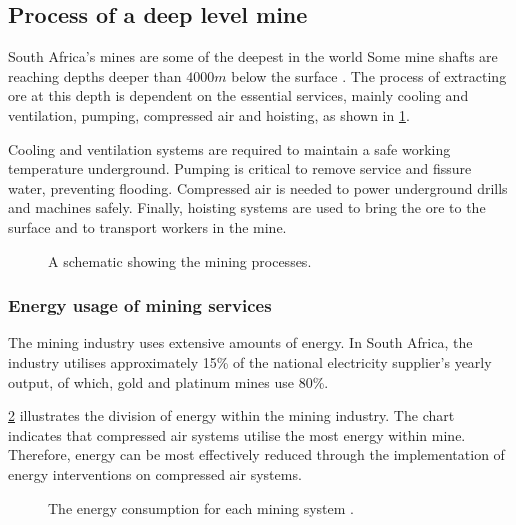 	\subsection{Process of a deep level mine}
	South Africa's mines are some of the deepest in the world Some mine shafts are reaching depths deeper than $4000m$ below the surface \cite{vosloo2012case}. The process of extracting ore at this depth is dependent on the essential services, mainly cooling and ventilation, pumping, compressed air and hoisting, as shown in \cref{fig: Mining Layout}.
	\par 
	 Cooling and ventilation systems are required to maintain a safe working temperature underground. Pumping is critical to remove service and fissure water, preventing flooding. Compressed air is needed to power underground drills and machines safely. Finally, hoisting systems are used to bring the ore to the surface and to transport  workers in the mine. 
		\begin{figure}[h!]
			\centering
			\caption{A schematic showing the mining processes.}
			\label{fig: Mining Layout}
		\end{figure}
		\subsubsection{Energy usage of mining services}
			The mining industry uses extensive amounts of energy. In South Africa, the industry utilises approximately 15\% of the national electricity supplier's yearly output, of which, gold and platinum mines use 80\%.\cite{Eskom2010Energy}
			\par
			 \cref{fig: Energy Split} illustrates the division of energy within the mining industry. The chart indicates that compressed air systems utilise the most energy within mine. Therefore, energy can be most effectively reduced through the implementation of energy interventions on compressed air systems.
			\begin{figure}[h]
				\centering
				\fbox{}
				\caption[The energy consumption for each mining system.]{The energy consumption for each mining system \cite{le2005energy}.}
				\label{fig: Energy Split}
			\end{figure}
